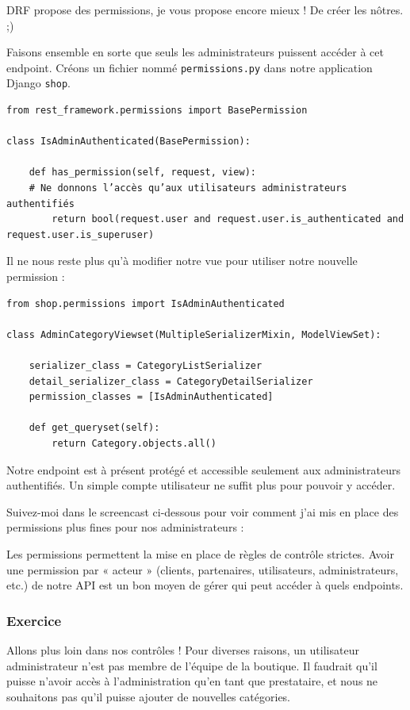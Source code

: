 \documentclass[a4paper]{article}
\begin{document}
DRF propose des permissions, je vous propose encore mieux ! De {\color{monOrange}créer les nôtres}. ;)

Faisons ensemble en sorte que {\color{monOrange}seuls les administrateurs} puissent accéder à cet endpoint. Créons un fichier nommé {\tt permissions.py}  dans notre application Django {\tt shop}.
\begin{verbatim}
from rest_framework.permissions import BasePermission
 
class IsAdminAuthenticated(BasePermission):
 
    def has_permission(self, request, view):
    # Ne donnons l’accès qu’aux utilisateurs administrateurs authentifiés
        return bool(request.user and request.user.is_authenticated and request.user.is_superuser)
\end{verbatim}
Il ne nous reste plus qu’à modifier notre vue pour utiliser notre nouvelle permission :
\begin{verbatim}
from shop.permissions import IsAdminAuthenticated
 
class AdminCategoryViewset(MultipleSerializerMixin, ModelViewSet):
 
    serializer_class = CategoryListSerializer
    detail_serializer_class = CategoryDetailSerializer
    permission_classes = [IsAdminAuthenticated]
 
    def get_queryset(self):
        return Category.objects.all()
\end{verbatim}
Notre endpoint est à présent {\color{monOrange}protégé} et accessible seulement aux {\color{monOrange}administrateurs authentifiés}. Un simple compte utilisateur ne suffit plus pour pouvoir y accéder.

Suivez-moi dans le screencast ci-dessous pour voir comment j'ai mis en place des permissions plus fines pour nos administrateurs :


Les permissions permettent la mise en place de règles de contrôle strictes. Avoir une permission par « acteur » (clients, partenaires, utilisateurs, administrateurs, etc.) de notre API est un bon moyen de gérer qui peut accéder à quels endpoints.

\subsubsection*{Exercice}
Allons plus loin dans nos contrôles ! Pour diverses raisons, un utilisateur administrateur n’est pas membre de l’équipe de la boutique. Il faudrait qu'il puisse n'avoir accès à l’administration qu'en tant que {\color{monOrange}prestataire}, et nous ne souhaitons pas qu’il puisse ajouter de nouvelles catégories.
\end{document}

